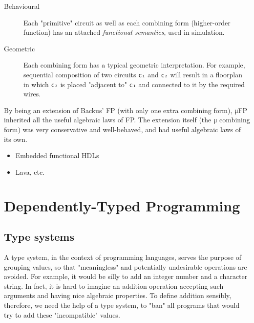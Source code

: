         \begin{description}
            \item[Behavioural]
                Each "primitive" circuit as well as each combining form (higher-order function)
                has an attached \emph{functional semantics}, used in simulation.
            \item[Geometric]
                Each combining form has a typical geometric interpretation.
                For example, sequential composition of two circuits \texttt{c₁} and \texttt{c₂} will result
                in a floorplan in which \texttt{c₂} is placed "adjacent to" \texttt{c₁} and connected to it
                by the required wires.
        \end{description}

        By being an extension of Backus' FP (with only one extra combining form),
        μFP inherited all the useful algebraic laws of FP.
        The extension itself (the μ combining form) was very conservative and well-behaved,
        and had useful algebraic laws of its own.


        \begin{itemize}
            \item Embedded functional HDLs
            \item Lava, etc.
        \end{itemize}


    \section{Dependently-Typed Programming}
    \label{sec:dtp}

        \subsection{Type systems}
        \label{subsec:type-systems}
            A type system, in the context of programming languages,
            serves the purpose of grouping values, so that "meaningless" and potentially undesirable operations are avoided.
            For example, it would be silly to add an integer number and a character string.
            In fact, it is hard to imagine an addition operation accepting such arguments and having nice algebraic properties.
            To define addition sensibly, therefore, we need the help of a type system,
            to "ban" all programs that would try to add these "incompatible" values.


